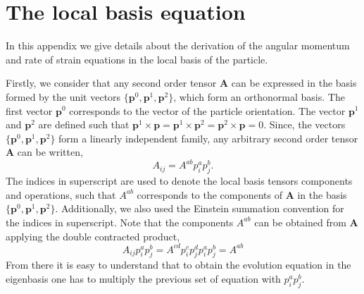 



\section{The local basis equation}
\label{ap:local_basis_eq}

In this appendix we give details about the derivation of the angular momentum and rate of strain equations in the local basis of the particle. 

Firstly, we consider that any second order tensor $\textbf{A}$ can be expressed in the basis formed by the unit vectors $\{\textbf{p}^0,\textbf{p}^1,\textbf{p}^2\}$, which form an orthonormal basis. 
The first vector $\textbf{p}^0$ corresponds to the vector of the particle orientation. 
The vector $\textbf{p}^1$ and $\textbf{p}^2$ are defined such that $\textbf{p}^1 \times \textbf{p} =\textbf{p}^1 \times \textbf{p}^2=\textbf{p}^2 \times \textbf{p} =0$. 
Since, the vectors $\{\textbf{p}^0,\textbf{p}^1,\textbf{p}^2\}$ form a linearly independent family, any arbitrary second order tensor  \textbf{A} can be written, 
\begin{equation}
    A_{ij}
    = 
    A^{ab}
    p_i^a
    p_j^b.
\end{equation}
The indices in superscript are used to denote the local basis tensors  components and operations, such that $A^{ab}$ corresponds to the components of \textbf{A} in the basis $\{\textbf{p}^0,\textbf{p}^1,\textbf{p}^2\}$. 
Additionally, we also used the Einstein summation convention for the indices in superscript. 
Note that the components $A^{ab}$ can be obtained from \textbf{A} applying the double contracted product,  
\begin{equation*}
    A_{ij} 
    p_i^a
    p_j^b
    = 
    A^{cd}
    p_i^c
    p_j^d
    p_i^a
    p_j^b
    = 
    A^{ab}
\end{equation*}
From there it is easy to understand that to obtain the evolution equation in the eigenbasis one has to multiply the previous set of equation with $p_i^ap_j^b$. 

